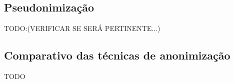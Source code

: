 \subsection{Pseudonimização}
TODO:(VERIFICAR SE SERÁ PERTINENTE...)

\subsection{Comparativo das técnicas de anonimização}
TODO








